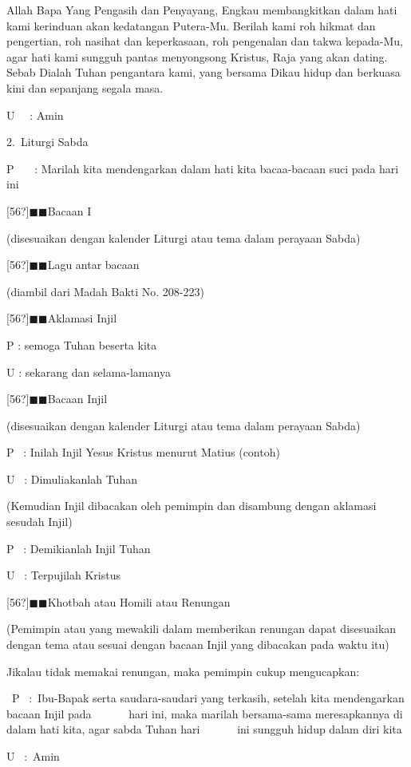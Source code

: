 \documentclass{article}
\begin{document}
Allah Bapa Yang Pengasih dan Penyayang, Engkau membangkitkan dalam hati kami kerinduan akan kedatangan Putera-Mu.
Berilah kami roh hikmat dan pengertian, roh nasihat dan keperkasaan, roh pengenalan dan takwa kepada-Mu, agar hati kami
sungguh pantas menyongsong Kristus, Raja yang akan dating. Sebab Dialah Tuhan pengantara kami, yang bersama Dikau hidup
dan berkuasa kini dan sepanjang segala masa.

U~~ : Amin

2.~Liturgi Sabda

P~~~ : Marilah kita mendengarkan dalam hati kita bacaa-bacaan suci pada hari ini

[56?]${\blacksquare}{\blacksquare}$Bacaan I

(disesuaikan dengan kalender Liturgi atau tema dalam perayaan Sabda)

[56?]${\blacksquare}{\blacksquare}$Lagu antar bacaan

(diambil dari Madah Bakti No. 208-223)

[56?]${\blacksquare}{\blacksquare}$Aklamasi Injil

P : semoga Tuhan beserta kita

U : sekarang dan selama-lamanya

[56?]${\blacksquare}{\blacksquare}$Bacaan Injil

(disesuaikan dengan kalender Liturgi atau tema dalam perayaan Sabda)

P~ : Inilah Injil Yesus Kristus menurut Matius (contoh)

U~ : Dimuliakanlah Tuhan

(Kemudian Injil dibacakan oleh pemimpin dan disambung dengan aklamasi sesudah Injil)

P~ : Demikianlah Injil Tuhan

U~ : Terpujilah Kristus

[56?]${\blacksquare}{\blacksquare}$Khotbah atau Homili atau Renungan

(Pemimpin atau yang mewakili dalam memberikan renungan dapat disesuaikan dengan tema atau sesuai dengan bacaan Injil
yang dibacakan pada waktu itu)

Jikalau tidak memakai renungan, maka pemimpin cukup mengucapkan:

~P~ :~Ibu-Bapak serta saudara-saudari yang terkasih, setelah kita mendengarkan bacaan Injil pada ~ ~ ~ ~hari ini, maka
marilah bersama-sama meresapkannya di dalam hati kita, agar sabda Tuhan hari ~ ~ ~ ~ini sungguh hidup dalam diri kita

U~ :~Amin
\end{document}
